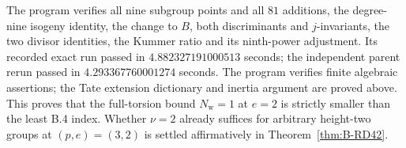 \begin{remark}
The program  verifies all
nine subgroup points and all $81$ additions, the degree-nine
isogeny identity, the change to $B$, both discriminants and
$j$-invariants, the two divisor identities, the Kummer ratio and
its ninth-power adjustment. Its recorded exact run passed in
$4.882327191000513$ seconds; the independent parent rerun passed
in $4.293367760001274$ seconds. The program verifies finite
algebraic assertions; the Tate extension dictionary and inertia
argument are proved above.
This proves that the full-torsion bound $N_{\mathrm w}=1$ at
$e=2$ is strictly smaller than the least B.4 index. Whether
$\nu=2$ already suffices for arbitrary height-two groups at
$(p,e)=(3,2)$ is settled affirmatively in Theorem~\ref{thm:B-RD42}.
\end{remark}
